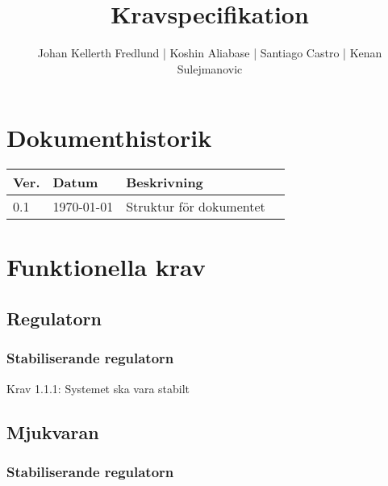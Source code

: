 \documentclass[a4paper]{article}
\title{Kravspecifikation}
\author{Johan Kellerth Fredlund | Koshin Aliabase | Santiago Castro | Kenan Sulejmanovic}
\date{}
\begin{document}
\maketitle
\thispagestyle{fancy}
\tableofcontents
\newpage

\section*{Dokumenthistorik}

\begin{tabular}{ l l l p{8.5cm} }
Ver. & Datum & Beskrivning \\\hline
0.1 & \today  & Struktur för dokumentet\\
\end{tabular}



\section{Funktionella krav}
	\subsection{Regulatorn}
		\subsubsection{Stabiliserande regulatorn}
        	Krav 1.1.1: Systemet ska vara stabilt
	
    \subsection{Mjukvaran}
		\subsubsection{Stabiliserande regulatorn}
\end{document}
